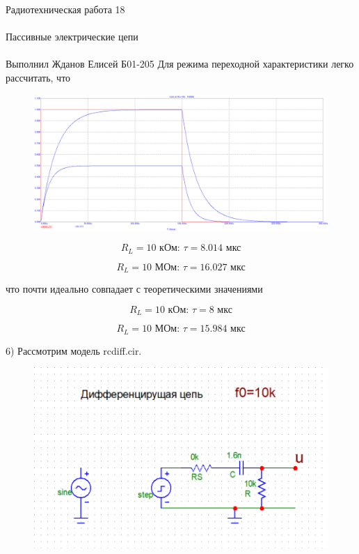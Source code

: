 \documentclass{astroedu-lab}
\begin{document}
\begin{problem}{\huge Радиотехническая работа 18\\\\Пассивные электрические цепи\\\\Выполнил Жданов Елисей Б01-205}
Для режима переходной характеристики легко рассчитать, что

\begin{figure}[!h]
	\centering
	\includegraphics[width=1\textwidth]{1_7.png}
	\label{fig:boiler}
\end{figure}

\begin{equation}
	R_L = 10 \text{ кОм: } \tau = 8.014 \text{ мкс}
\end{equation}

\begin{equation}
	R_L = 10 \text{ МОм: } \tau = 16.027 \text{ мкс}
\end{equation}

что почти идеально совпадает с теоретическими значениями

\begin{equation}
	R_L = 10 \text{ кОм: } \tau = 8 \text{ мкс}
\end{equation}

\begin{equation}
	R_L = 10 \text{ МОм: } \tau = 15.984 \text{ мкс}
\end{equation}

6) Рассмотрим модель rcdiff.cir.

\begin{figure}[!h]
	\centering
	\includegraphics[width=1\textwidth]{1_8.png}
	\label{fig:boiler}
\end{figure}


\end{problem}
\end{document}
